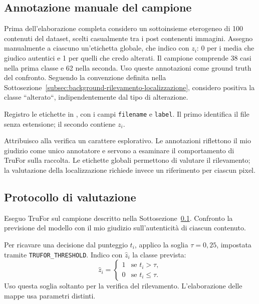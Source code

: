 \subsection{Annotazione manuale del campione}
\label{subsec:materiali-trufor-annotazioni}

Prima dell'elaborazione completa considero un sottoinsieme eterogeneo di 100 contenuti del dataset, scelti casualmente tra i post contenenti immagini. Assegno manualmente a ciascuno un'etichetta globale, che indico con $z_i$: 0 per i media che giudico autentici e 1 per quelli che credo alterati. Il campione comprende 38 casi nella prima classe e 62 nella seconda. Uso queste annotazioni come ground truth del confronto. Seguendo la convenzione definita nella Sottosezione~\ref{subsec:background-rilevamento-localizzazione}, considero positiva la classe ``alterato``, indipendentemente dal tipo di alterazione.

Registro le etichette in , con i campi \texttt{filename} e \texttt{label}. Il primo identifica il file senza estensione; il secondo contiene $z_i$.

Attribuisco alla verifica un carattere esplorativo. Le annotazioni riflettono il mio giudizio come unico annotatore e servono a esaminare il comportamento di TruFor sulla raccolta. Le etichette globali permettono di valutare il rilevamento; la valutazione della localizzazione richiede invece un riferimento per ciascun pixel.

\subsection{Protocollo di valutazione}
\label{subsec:trufor-test-protocollo}

Eseguo TruFor sul campione descritto nella Sottosezione~\ref{subsec:materiali-trufor-annotazioni}. Confronto la previsione del modello con il mio giudizio sull'autenticità di ciascun contenuto.

Per ricavare una decisione dal punteggio $t_i$, applico la soglia $\tau=0{,}25$, impostata tramite \texttt{TRUFOR\_THRESHOLD}. Indico con $\widehat{z}_i$ la classe prevista:
\begin{equation}
    \widehat{z}_i =
    \begin{cases}
        1 & \text{se } t_i > \tau, \\
        0 & \text{se } t_i \leq \tau.
    \end{cases}
    \label{eq:metodi-trufor-soglia}
\end{equation}
Uso questa soglia soltanto per la verifica del rilevamento. L'elaborazione delle mappe usa parametri distinti.

